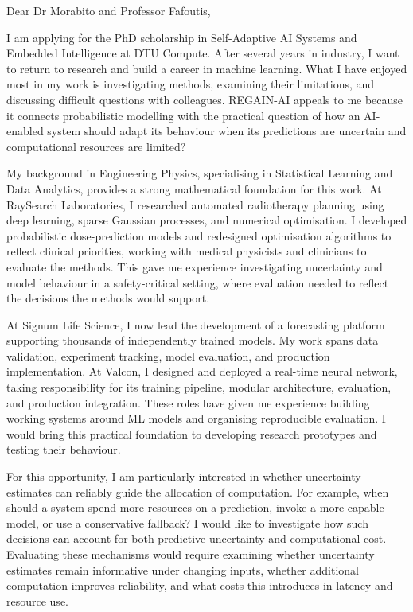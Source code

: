 \documentclass[11pt,a4paper]{moderncv}
\begin{document}
\makecvtitle

Dear Dr Morabito and Professor Fafoutis,

\vspace*{2em}
I am applying for the PhD scholarship in Self-Adaptive AI Systems and Embedded Intelligence at DTU Compute. After several years in industry, I want to return to research and build a career in machine learning. What I have enjoyed most in my work is investigating methods, examining their limitations, and discussing difficult questions with colleagues. REGAIN-AI appeals to me because it connects probabilistic modelling with the practical question of how an AI-enabled system should adapt its behaviour when its predictions are uncertain and computational resources are limited?

\vspace{4pt}
\hspace*{2em}
My background in Engineering Physics, specialising in Statistical Learning and Data Analytics, provides a strong mathematical foundation for this work. At RaySearch Laboratories, I researched automated radiotherapy planning using deep learning, sparse Gaussian processes, and numerical optimisation. I developed probabilistic dose-prediction models and redesigned optimisation algorithms to reflect clinical priorities, working with medical physicists and clinicians to evaluate the methods. This gave me experience investigating uncertainty and model behaviour in a safety-critical setting, where evaluation needed to reflect the decisions the methods would support.

\vspace{4pt}
\hspace*{2em}
At Signum Life Science, I now lead the development of a forecasting platform supporting thousands of independently trained models. My work spans data validation, experiment tracking, model evaluation, and production implementation. At Valcon, I designed and deployed a real-time neural network, taking responsibility for its training pipeline, modular architecture, evaluation, and production integration. These roles have given me experience building working systems around ML models and organising reproducible evaluation. I would bring this practical foundation to developing research prototypes and testing their behaviour.

\vspace{4pt}
\hspace*{2em}
For this opportunity, I am particularly interested in whether uncertainty estimates can reliably guide the allocation of computation. For example, when should a system spend more resources on a prediction, invoke a more capable model, or use a conservative fallback? I would like to investigate how such decisions can account for both predictive uncertainty and computational cost. Evaluating these mechanisms would require examining whether uncertainty estimates remain informative under changing inputs, whether additional computation improves reliability, and what costs this introduces in latency and resource use.
\end{document}
